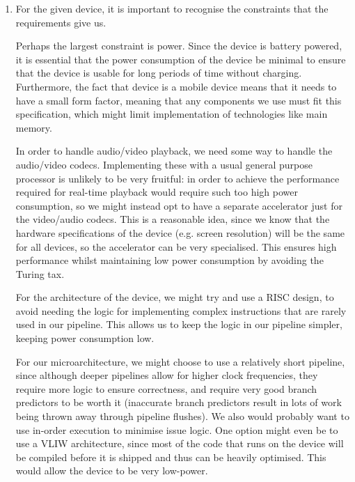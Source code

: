 


\begin{enumerate}[label=(\alph*)]

  \item
    For the given device, it is important to recognise the constraints that the requirements give us.

    Perhaps the largest constraint is power. Since the device is battery powered, it is essential that the power consumption of the device be minimal to ensure that the device is usable for long periods of time without charging. Furthermore, the fact that device is a mobile device means that it needs to have a small form factor, meaning that any components we use must fit this specification, which might limit implementation of technologies like main memory.

    In order to handle audio/video playback, we need some way to handle the audio/video codecs. Implementing these with a usual general purpose processor is unlikely to be very fruitful: in order to achieve the performance required for real-time playback would require such too high power consumption, so we might instead opt to have a separate accelerator just for the video/audio codecs. This is a reasonable idea, since we know that the hardware specifications of the device (e.g. screen resolution) will be the same for all devices, so the accelerator can be very specialised. This ensures high performance whilst maintaining low power consumption by avoiding the Turing tax.

    For the architecture of the device, we might try and use a RISC design, to avoid needing the logic for implementing complex instructions that are rarely used in our pipeline. This allows us to keep the logic in our pipeline simpler, keeping power consumption low.

    For our microarchitecture, we might choose to use a relatively short pipeline, since although deeper pipelines allow for higher clock frequencies, they require more logic to ensure correctness, and require very good branch predictors to be worth it (inaccurate branch predictors result in lots of work being thrown away through pipeline flushes). We also would probably want to use in-order execution to minimise issue logic. One option might even be to use a VLIW architecture, since most of the code that runs on the device will be compiled before it is shipped and thus can be heavily optimised. This would allow the device to be very low-power.


\end{enumerate}
